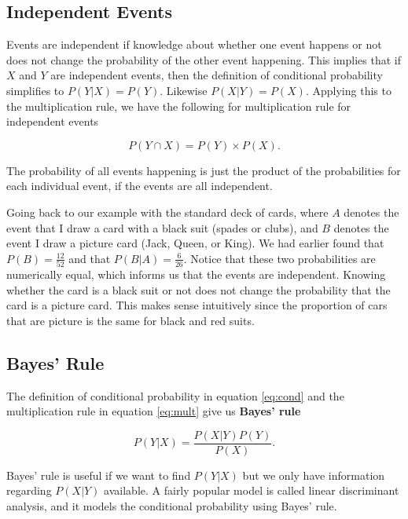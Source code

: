 \documentclass[
]{book}
\begin{document}
\subsection{Independent Events}\label{independent-events}

Events are independent if knowledge about whether one event happens or not does not change the probability of the other event happening. This implies that if \(X\) and \(Y\) are independent events, then the definition of conditional probability simplifies to \(P(Y|X) = P(Y)\). Likewise \(P(X|Y) = P(X)\). Applying this to the multiplication rule, we have the following for multiplication rule for independent events

\begin{equation} 
P(Y \cap X) = P(Y) \times P(X).
\label{eq:mult2}
\end{equation}

The probability of all events happening is just the product of the probabilities for each individual event, if the events are all independent.

Going back to our example with the standard deck of cards, where \(A\) denotes the event that I draw a card with a black suit (spades or clubs), and \(B\) denotes the event I draw a picture card (Jack, Queen, or King). We had earlier found that \(P(B) = \frac{12}{52}\) and that \(P(B|A) = \frac{6}{26}\). Notice that these two probabilities are numerically equal, which informs us that the events are independent. Knowing whether the card is a black suit or not does not change the probability that the card is a picture card. This makes sense intuitively since the proportion of cars that are picture is the same for black and red suits.

\subsection{Bayes' Rule}\label{bayes-rule}

The definition of conditional probability in equation \eqref{eq:cond} and the multiplication rule in equation \eqref{eq:mult} give us \textbf{Bayes' rule}

\begin{equation} 
P(Y|X) = \frac{P(X|Y)P(Y)}{P(X)}.
\label{eq:bayes}
\end{equation}

Bayes' rule is useful if we want to find \(P(Y|X)\) but we only have information regarding \(P(X|Y)\) available. A fairly popular model is called linear discriminant analysis, and it models the conditional probability using Bayes' rule.
\end{document}
